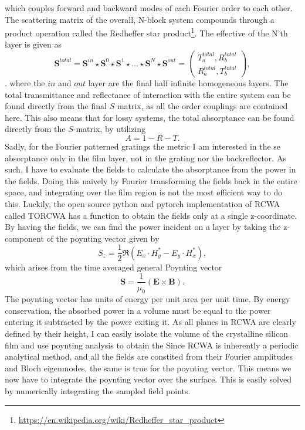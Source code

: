 which couples forward and backward modes of each Fourier order to each other. The scattering matrix of the overall, N-block system compounds through a product operation called the Redheffer star product\footnote{\url{https://en.wikipedia.org/wiki/Redheffer_star_product}}.
The effective of the N'th layer is given as
$$
\mathbf{S}^{total} = \mathbf{S}^{in}\star\mathbf{S}^0\star \mathbf{S}^1\star...\star \mathbf{S}^N \star \mathbf{S}^{out} = \left(\begin{matrix}
    T_a^{total}, R_b^{total} \\
    R_a^{total}, T_b^{total}
\end{matrix}\right),
$$.
where the $in$ and $out$ layer are the final half infinite homogeneous layers.
The total transmittance and reflectance of interaction with the entire system can be found directly from the final $S$ matrix, as all the order couplings are contained here. This also means that for lossy systems, the total absorptance can be found directly from the $S$-matrix, by utilizing
$$
A = 1 - R - T.
$$
Sadly, for the Fourier patterned gratings the metric I am interested in the se absorptance only in the film layer, not in the grating nor the backreflector. As such, I have to evaluate the fields to calculate the absorptance from the power in the fields.
Doing this naively by Fourier transforming the fields back in the entire space, and integrating over the film region is not the most efficient way to do this. Luckily, the open source python and pytorch implementation of RCWA called TORCWA \cite{torcwa} has a function to obtain the fields only at a single z-coordinate.
By having the fields, we can find the power incident on a layer by taking the z-component of the poynting vector given by
$$
\label{poynting}
S_z = \frac{1}{2}\Re\left(E_x \cdot H_y^* - E_y \cdot H_x^*\right),
$$
which arises from the time averaged general Poynting vector
$$
\mathbf{S} = \frac{1}{\mu_0}\left(\mathbf{E} \times \mathbf{B} \right).
$$
The poynting vector has units of energy per unit area per unit time. By energy conservation, the absorbed power in a volume must be equal to the power entering it subtracted by the power exiting it. As all planes in RCWA are clearly defined by their height, I can easily isolate the volume of the crystalline silicon film and use poynting analysis to obtain the 
Since RCWA is inherently a periodic analytical method, and all the fields are constited from their Fourier amplitudes and Bloch eigenmodes, the same is true for the poynting vector. This means we now have to integrate the poynting vector over the surface. This is easily solved by numerically integrating the sampled field points.
